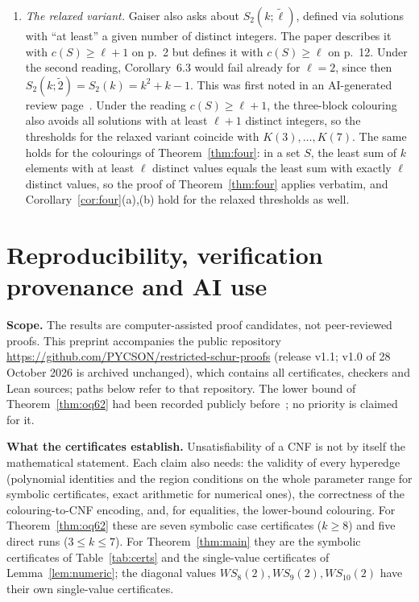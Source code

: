 \documentclass[11pt]{amsart}
\theoremstyle{definition}
\newcommand{\Stwo}{S_2}
\begin{document}
\begin{enumerate}[label=\arabic*.]
\item \emph{The relaxed variant.} Gaiser also asks about $\Stwo(k;\tilde\ell)$, defined via solutions with ``at least'' a given number of distinct integers. The paper describes it with $c(S)\ge\ell+1$ on p.~2 but defines it with $c(S)\ge\ell$ on p.~12. Under the second reading, Corollary~6.3 would fail already for $\ell=2$, since then $\Stwo(k;\tilde2)=S_2(k)=k^2+k-1$. This was first noted in an AI-generated review page~\cite{pith}. Under the reading $c(S)\ge\ell+1$, the three-block colouring also avoids all solutions with at least $\ell+1$ distinct integers, so the thresholds for the relaxed variant coincide with $K(3),\dots,K(7)$. The same holds for the colourings of Theorem~\ref{thm:four}: in a set $S$, the least sum of $k$ elements with at least $\ell$ distinct values equals the least sum with exactly $\ell$ distinct values, so the proof of Theorem~\ref{thm:four} applies verbatim, and Corollary~\ref{cor:four}(a),(b) hold for the relaxed thresholds as well.
\end{enumerate}

\appendix
\section{Reproducibility, verification provenance and AI use}\label{app:repro-ai}



\smallskip\noindent\textbf{Scope.} The results are computer-assisted proof candidates, not peer-reviewed proofs. This preprint accompanies the public repository \url{https://github.com/PYCSON/restricted-schur-proofs} (release v1.1; v1.0 of 28 October 2026 is archived unchanged), which contains all certificates, checkers and Lean sources; paths below refer to that repository. The lower bound of Theorem~\ref{thm:oq62} had been recorded publicly before~\cite{omega}; no priority is claimed for it.


\smallskip\noindent\textbf{What the certificates establish.} Unsatisfiability of a CNF is not by itself the mathematical statement. Each claim also needs: the validity of every hyperedge (polynomial identities and the region conditions on the whole parameter range for symbolic certificates, exact arithmetic for numerical ones), the correctness of the colouring-to-CNF encoding, and, for equalities, the lower-bound colouring. For Theorem~\ref{thm:oq62} these are seven symbolic case certificates ($k\ge8$) and five direct runs ($3\le k\le7$). For Theorem~\ref{thm:main} they are the symbolic certificates of Table~\ref{tab:certs} and the single-value certificates of Lemma~\ref{lem:numeric}; the diagonal values $WS_8(2),WS_9(2),WS_{10}(2)$ have their own single-value certificates.
\end{document}
